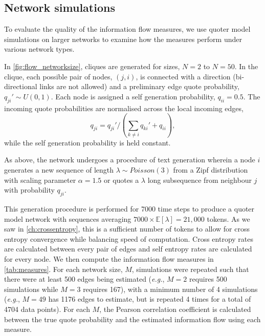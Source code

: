 \subsection{Network simulations}\label{sec:network_sizes}
To evaluate the quality of the information flow measures, we use quoter model simulations on larger networks to examine how the measures perform under various network types. 

In \autoref{fig:flow_networksize}, cliques are generated for sizes, $N=2$ to $N=50$. In the clique, each possible pair of nodes, $(j,i)$, is connected with a direction (bi-directional links are not allowed) and a preliminary edge quote probability, $q_{ji}' \sim U(0,1)$. Each node is assigned a self generation probability, $q_{ii}=0.5$. The incoming quote probabilities are normalised across the local incoming edges, 
$$q_{ji} = q_{ji}' / \left( \sum_{k\neq i} q_{ki}' + q_{ii} \right),$$
while the self generation probability is held constant. 

As above, the network undergoes a procedure of text generation wherein a node $i$ generates a new sequence of length $\lambda \sim Poisson(3)$ from a Zipf distribution with scaling parameter $\alpha = 1.5$ or quotes a $\lambda$ long subsequence from neighbour $j$ with probability $q_{ji}$.

This generation procedure is performed for 7000 time steps to produce a quoter model network with sequences averaging $7000\times\mathbb{E}[\lambda]=21,000$ tokens. As we saw in \autoref{ch:crossentropy}, this is a sufficient number of tokens to allow for cross entropy convergence while balancing speed of computation. Cross entropy rates are calculated between every pair of edges and self entropy rates are calculated for every node. We then compute the information flow measures in \autoref{tab:measures}. For each network size, $M$, simulations were repeated such that there were at least 500 edges being estimated (\emph{e.g.}, $M=2$ requires 500 simulations while $M=3$ requires 167), with a minimum number of 4 simulations (\emph{e.g.}, $M=49$ has 1176 edges to estimate, but is repeated 4 times for a total of 4704 data points). For each $M$, the Pearson correlation coefficient is calculated between the true quote probability and the estimated information flow using each measure.

